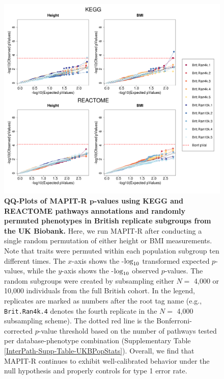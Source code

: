 \documentclass[10pt]{article}
\def\log{{\rm log}}
\begin{document}
\begin{figure}[htbp]
\centering
\includegraphics[width=\textwidth]{Images/Supp/InterPath_Supp_Figure_BritReps_perm1_QQPlots_AllPaths_vs1.png}
\caption{\textbf{QQ-Plots of MAPIT-R $\bm{p}$-values using KEGG and REACTOME pathways annotations and randomly permuted phenotypes in British replicate subgroups from the UK Biobank.} Here, we run MAPIT-R after conducting a single random permutation of either height or BMI measurements. Note that traits were permuted within each population subgroup ten different times. The $x$-axis shows the -$\log_{10}$ transformed expected $p$-values, while the $y$-axis shows the -$\log_{10}$ observed $p$-values. The random subgroups were created by subsampling either $N =$ 4,000 or 10,000 individuals from the full British cohort. In the legend, replicates are marked as numbers after the root tag name (e.g., \texttt{Brit.Ran4k.4} denotes the fourth replicate in the $N =$ 4,000 subsampling scheme). The dotted red line is the Bonferroni-corrected $p$-value threshold based on the number of pathways tested per database-phenotype combination (Supplementary Table \ref{InterPath-Supp-Table-UKBPopStats}). Overall, we find that MAPIT-R continues to exhibit well-calibrated behavior under the null hypothesis and properly controls for type 1 error rate.}
\label{InterPath-Supp-Figure-BritReps-perm1-QQPlots-AllPaths}
\end{figure}
\clearpage
\end{document}
